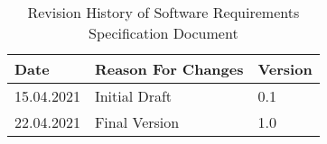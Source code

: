 \begin{table}[H]
    \centering
    \begin{tabular}{|l|l|l|}
    	\hline
         Date & Reason For Changes & Version \\
         \hline
         15.04.2021 & Initial Draft & 0.1 \\
         \hline
         22.04.2021 & Final Version & 1.0 \\
        \hline
    \end{tabular}
    \caption{Revision History of Software Requirements Specification Document}
    \label{tab:srs_rh}
\end{table}